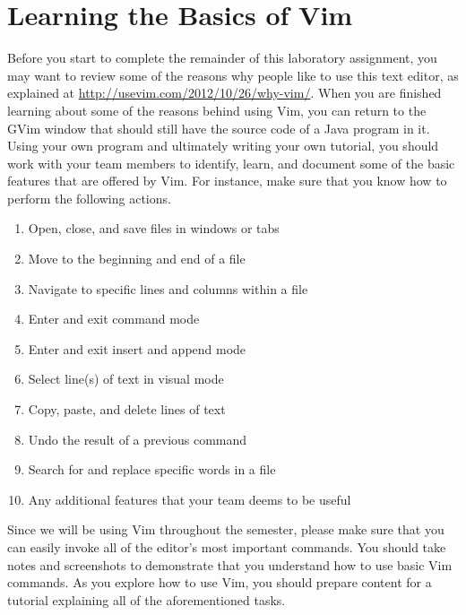 \section*{Learning the Basics of Vim}

Before you start to complete the remainder of this laboratory assignment, you may want to review some of the reasons why people
like to use this text editor, as explained at \url{http://usevim.com/2012/10/26/why-vim/}.  When you are finished learning about
some of the reasons behind using Vim, you can return to the GVim window that should still have the source code of a Java program
in it. Using your own program and ultimately writing your own tutorial, you should work with your team members to identify,
learn, and document some of the basic features that are offered by Vim.  For instance, make sure that you know how to perform the
following actions.  

\begin{enumerate}

	\item Open, close, and save files in windows or tabs

	\item Move to the beginning and end of a file

	\item Navigate to specific lines and columns within a file

	\item Enter and exit command mode

	\item Enter and exit insert and append mode

	\item Select line(s) of text in visual mode

	\item Copy, paste, and delete lines of text

	\item Undo the result of a previous command

	\item Search for and replace specific words in a file 

	\item Any additional features that your team deems to be useful

\end{enumerate}

Since we will be using Vim throughout the semester, please make sure that you can easily invoke all of the editor's most
important commands.  You should take notes and screenshots to demonstrate that you understand how to use basic
Vim commands. As you explore how to use Vim, you should prepare content for a tutorial explaining all of the
aforementioned tasks. 

